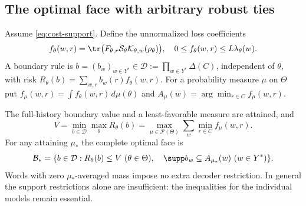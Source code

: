 \subsection{The optimal face with arbitrary robust ties}
Assume \eqref{eq:cost-support}. Define the unnormalized loss coefficients
\[
 f_\theta(w,r)=\tr\bigl(F_{\theta,r}\mathcal S_\theta
                  \mathcal K_{\theta,w}(\rho_\theta)\bigr),
 \quad 0\le f_\theta(w,r)\le L\lambda_\theta(w).
\]
A boundary rule is $b=(b_w)_{w\in Y^*}\in\mathcal D:=\prod_{w\in Y^*}\Delta(C)$, independent of $\theta$, with risk
$R_\theta(b)=\sum_{w,r}b_w(r)f_\theta(w,r)$.
For a probability measure $\mu$ on $\Theta$ put
$f_\mu(w,r)=\int f_\theta(w,r)\,d\mu(\theta)$ and
$A_\mu(w)=\arg\min_{r\in C} f_\mu(w,r)$.

\begin{theorem}\label{thm:weighted-face}
The full-history boundary value and a least-favorable measure are attained, and
\begin{equation}\label{eq:weighted-minimax}
 V=\min_{b\in\mathcal D}\max_\theta R_\theta(b)
   =\max_{\mu\in\mathcal P(\Theta)}
           \sum_w\min_{r\in C}f_\mu(w,r).
\end{equation}
For any attaining $\mu_*$ the complete optimal face is
\begin{equation}\label{eq:optimal-face}
 \mathcal B_*=
 \{b\in\mathcal D:R_\theta(b)\le V\ (\theta\in\Theta),\quad
               \supp b_w\subseteq A_{\mu_*}(w)\ (w\in Y^*)\}.
\end{equation}
Words with zero $\mu_*$-averaged mass impose no extra decoder restriction. In general the support restrictions alone are insufficient: the inequalities for the individual models remain essential.
\end{theorem}
